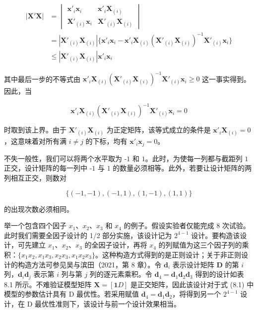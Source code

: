 \documentclass{ctexart}
\begin{document}
\begin{align*}
|\boldsymbol{X}'\boldsymbol{X}|&=
\begin{vmatrix}
\boldsymbol{x}'_i\boldsymbol{x}_i&\boldsymbol{x}'_i\boldsymbol{X}_{(i)}\\
\boldsymbol{X}'_{(i)}\boldsymbol{x}_i&\boldsymbol{X}'_{(i)}\boldsymbol{X}_{(i)}
\end{vmatrix}\\
&=|\boldsymbol{X}'_{(i)}\boldsymbol{X}_{(i)}|\{\boldsymbol{x}'_i\boldsymbol{x}_i-\boldsymbol{x}'_i\boldsymbol{X}_{(i)}(\boldsymbol{X}'_{(i)}\boldsymbol{X}_{(i)})^{-1}\boldsymbol{X}'_{(i)}\boldsymbol{x}_i\}\\
&\le|\boldsymbol{X}'_{(i)}\boldsymbol{X}_{(i)}|\boldsymbol{x}'_i\boldsymbol{x}_i
\end{align*}

其中最后一步的不等式由 $\boldsymbol{x}'_i\boldsymbol{X}_{(i)}(\boldsymbol{X}'_{(i)}\boldsymbol{X}_{(i)})^{-1}\boldsymbol{X}'_{(i)}\boldsymbol{x}_i\ge0$ 这一事实得到。因此，当

\begin{equation*}
\boldsymbol{x}'_i\boldsymbol{X}_{(i)}(\boldsymbol{X}'_{(i)}\boldsymbol{X}_{(i)})^{-1}\boldsymbol{X}'_{(i)}\boldsymbol{x}_i=0
\end{equation*}

时取到该上界。由于 $\boldsymbol{X}'_{(i)}\boldsymbol{X}_{(i)}$ 为正定矩阵，该等式成立的条件是 $\boldsymbol{x}'_i\boldsymbol{X}_{(i)}=0$，这意味着对所有满 $i\neq j$ 的下标，均有 $\boldsymbol{x}'_i\boldsymbol{x}_j=0$。

不失一般性，我们可以将两个水平取为 $‑1$ 和 $1$。此时，为使每一列都与截距列 $1$ 正交，设计矩阵的每一列中 $‑1$ 与 $1$ 的数量必须相等。此外，若要让设计矩阵的两列相互正交，则数对

\begin{equation*}
\{(-1,-1),(-1,1),(1,-1),(1,1)\}
\end{equation*}

的出现次数必须相同。

举一个包含四个因子 $x_1$、$x_2$、$x_3$ 和 $x_4$ 的例子。假设实验者仅能完成 8 次试验。此时我们需要全因子设计的 1/2 部分实施，该设计记为 $2^{4-1}$ 设计。要构造该设计，可先建立 $x_1$、$x_2$、$x_3$ 的全因子设计，再将 $x_4$ 的列赋值为这三个因子列的乘积：$\{x_1x_2,x_1x_3,x_2x_3,x_1x_2x_3\}$。这种构造方式得到的是正则设计；关于非正则设计的构造方法可参见吴与滨田（2021，第 8 章）。令 $\boldsymbol{d}_i$ 表示设计矩阵 $\boldsymbol{D}$ 的第 $i$ 列，$\boldsymbol{d}_i\boldsymbol{d}_j$ 表示第 $i$ 列与第 $j$ 列的逐元素乘积。令 $\boldsymbol{d}_4=\boldsymbol{d}_1\boldsymbol{d}_2\boldsymbol{d}_3$ 得到的设计如表 8.1 所示。不难验证模型矩阵 $\boldsymbol{X}=[\boldsymbol{1}D]$ 是正交矩阵，因此该设计对于式 (8.1) 中模型的参数估计具有 D 最优性。若采用赋值 $\boldsymbol{d}_4=\boldsymbol{d}_1\boldsymbol{d}_2$，将得到另一个 $2^{4-1}$ 设计，在 D 最优性准则下，该设计与前一个设计效果相当。
\end{document}
